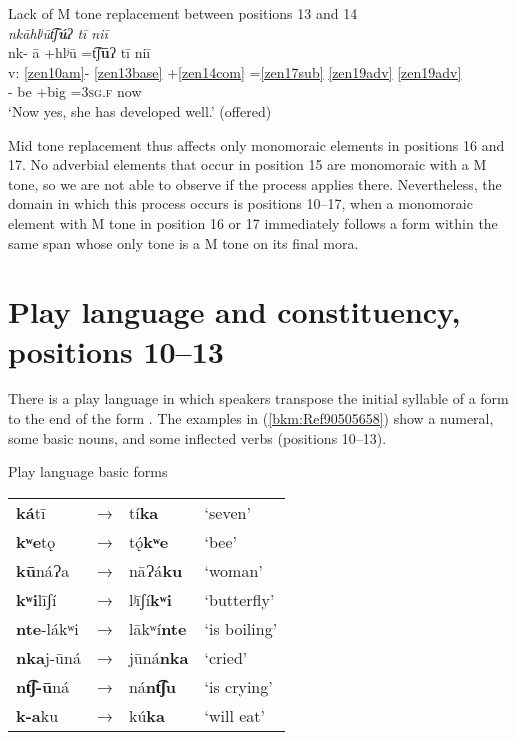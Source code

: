 \documentclass[output=paper]{langscibook}
\begin{document}
\ea\label{bkm:Ref90308462}Lack of M tone replacement between positions 13 and 14 \\
\textit{nkāhlʲūt͡ʃ\textbf{ú}ʔ tī niī} \\ 
    \glll {} nk- ā +hlʲū =t͡ʃ\textbf{ū}ʔ tī niī \\
    v: \ref{zen10am}{}- \ref{zen13base} +\ref{zen14com} =\ref{zen17sub} \ref{zen19adv} \ref{zen19adv} \\ 
    {} \Pfv{}- be +big =3\textsc{sg.f} \Tplz{} now \\
    \glt `Now yes, she has developed well.' (offered)
\z

Mid tone replacement thus affects only monomoraic elements in positions 16 and 17. No adverbial elements that occur in position 15 are monomoraic with a M tone, so we are not able to observe if the process applies there. Nevertheless, the domain in which this process occurs is positions 10{}--17, when a monomoraic element with M tone in position 16 or 17 immediately follows a form within the same span whose only tone is a M tone on its final mora.

\section{Play language and constituency, positions 10{}--13}
\label{bkm:Ref90496744}\label{bkm:Ref113308447}
There is a play language in which speakers transpose the initial syllable of a form to the end of the form \citep{Campbell2020}. The examples in (\ref{bkm:Ref90505658}) show a numeral, some basic nouns, and some inflected verbs (positions 10{}--13).

\newpage
\ea\label{bkm:Ref90505658}Play language basic forms\\
\begin{tabular}{llll}
\textbf{ká}tī & → & tí\textbf{ka} & `seven'\\
\textbf{kʷe}tǫ & → & tǫ́\textbf{kʷe} & `bee'\\
\textbf{kū}náɁa & → & nāɁá\textbf{ku} & `woman'\\
\textbf{kʷi}līʃí & → & lʲīʃí\textbf{kʷi} & `butterfly'\\
\textbf{nte}{}-lákʷi & → & lākʷí\textbf{nte} & `is boiling'\\
\textbf{nka}j-ūná & → & jūná\textbf{nka} & `cried'\\
\textbf{nt͡ʃ-ū}ná & → & ná\textbf{nt͡ʃu} & `is crying'\\
\textbf{k-a}ku & → & kú\textbf{ka} & `will eat'\\
\end{tabular}
\z 
\end{document}
